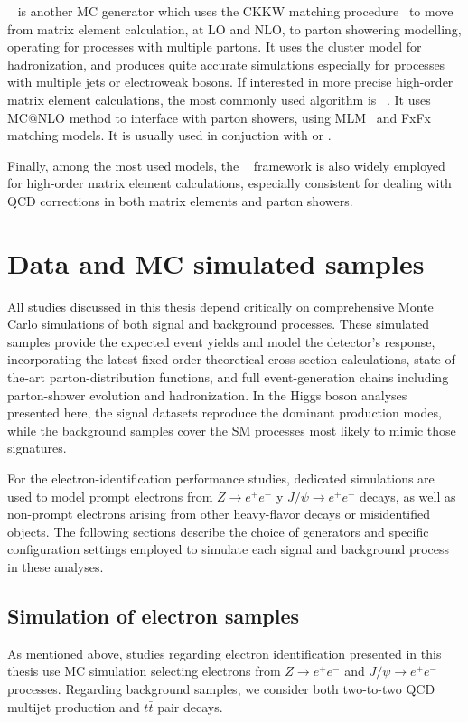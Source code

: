 \sherpa~\cite{Bothmann_2019} is another MC generator which uses the CKKW matching procedure~\cite{Lavesson_2008} to move from matrix element calculation, at LO and NLO, to parton showering modelling, operating for processes with multiple partons. It uses the cluster model for hadronization, and produces quite accurate simulations especially for processes with multiple jets or electroweak bosons. 
If interested in more precise high-order matrix element calculations, the most commonly used algorithm is \madgraph~\cite{Alwall_2014}. It uses \textsc{MC@NLO} method to interface with parton showers, using MLM~\cite{MANGANO2002343} and FxFx~\cite{Frederix_2012} matching models. It is usually used in conjuction with \pythia or \herwig.

Finally, among the most used models, the \powhegbox~\cite{Frixione_2007} framework is also widely employed for high-order matrix element calculations, especially consistent for dealing with QCD corrections in both matrix elements and parton showers.

\section{Data and MC simulated samples}
\label{sec:mc_samples}

All studies discussed in this thesis depend critically on comprehensive Monte Carlo simulations of both signal and background processes. These simulated samples provide the expected event yields and model the detector’s response, incorporating the latest fixed-order 
theoretical cross-section calculations, state-of-the-art parton-distribution functions, and full event-generation chains including parton-shower evolution and hadronization. In the Higgs boson analyses presented here, the signal datasets reproduce the dominant production modes, while the background samples cover the SM processes most likely to mimic those signatures.

For the electron-identification performance studies, dedicated simulations are used to model prompt electrons from $Z \rightarrow e^{+}e^{-} $ y $J/\psi \rightarrow e^{+}e^{-}$ decays, as well as non-prompt electrons arising from other heavy-flavor decays or misidentified objects. The following sections describe the choice of generators and specific configuration settings employed
to simulate each signal and background process in these analyses.

\subsection{Simulation of electron samples}
\label{subsec:electron_mc}
As mentioned above, studies regarding electron identification presented in this thesis use MC simulation selecting electrons from $Z \rightarrow e^{+}e^{-} $ and $J/\psi \rightarrow e^{+}e^{-}$ processes.
Regarding background samples, we consider both two-to-two QCD multijet production and $t\bar{t}$ pair decays.

